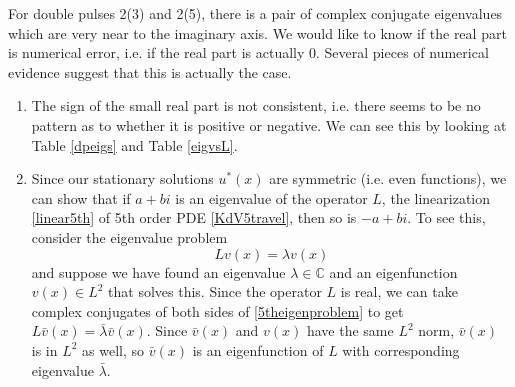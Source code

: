 \documentclass[12pt]{article}
\def\C{{\mathbb C}}
\begin{document}
For double pulses 2(3) and 2(5), there is a pair of complex conjugate eigenvalues which are very near to the imaginary axis. We would like to know if the real part is numerical error, i.e. if the real part is actually 0. Several pieces of numerical evidence suggest that this is actually the case. 

\begin{enumerate}

\item The sign of the small real part is not consistent, i.e. there seems to be no pattern as to whether it is positive or negative. We can see this by looking at Table \ref{dpeigs} and Table \ref{eigvsL}. 

\item Since our stationary solutions $u^*(x)$ are symmetric (i.e. even functions), we can show that if $a + bi$ is an eigenvalue of the operator $L$, the linearization \eqref{linear5th} of 5th order PDE \eqref{KdV5travel}, then so is $-a + bi$. To see this, consider the eigenvalue problem
\begin{equation}\label{5theigenproblem}
Lv(x) = \lambda v(x)
\end{equation}
and suppose we have found an eigenvalue $\lambda \in \C$ and an eigenfunction $v(x) \in L^2$ that solves this. Since the operator $L$ is real, we can take complex conjugates of both sides of \eqref{5theigenproblem} to get $L\bar{v}(x) = \bar{\lambda} \bar{v}(x)$. Since $\bar{v}(x)$ and $v(x)$ have the same $L^2$ norm, $\bar{v}(x)$ is in $L^2$ as well, so $\bar{v}(x)$ is an eigenfunction of $L$ with corresponding eigenvalue $\bar{\lambda}$.\\


\end{enumerate}
\end{document}
